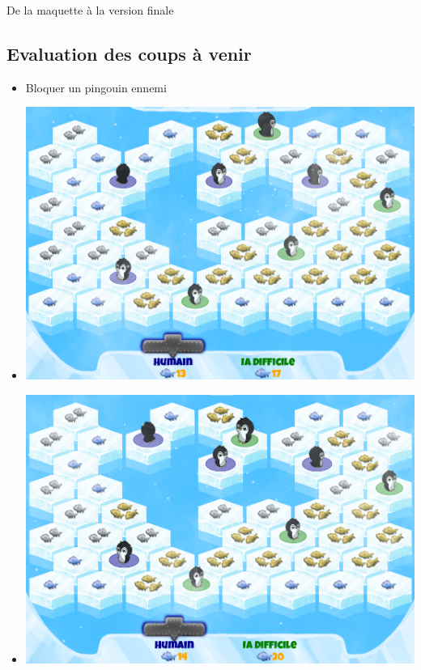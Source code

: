 \documentclass{beamer}
\begin{document}
\begin{frame}{De la maquette à la version finale}
\subsection{Evaluation des coups à venir}
\begin{frame}{}
\begin{block}{}
\begin{itemize}
 \item<1-> Bloquer un pingouin ennemi
 \item<2-> \includegraphics[scale=0.1]{IA5}
 \item<3-> \includegraphics[scale=0.1]{IA6}
\end{itemize}
\end{block}
\end{frame}


\end{frame}
\end{document}
